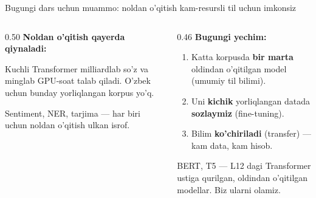 \documentclass[aspectratio=169,11pt]{beamer}
\begin{document}
\begin{frame}{Bugungi dars uchun muammo: noldan o'qitish kam-resursli til uchun imkonsiz}
  \begin{columns}[T]
    \begin{column}{0.50\textwidth}
      \textbf{Noldan o'qitish qayerda qiynaladi:}\\[3pt]
      \small
      \begin{tcolorbox}[warnbox,title={Ulkan ma'lumot talabi},top=2pt,bottom=2pt]
        \footnotesize
        Kuchli Transformer milliardlab so'z va minglab GPU-soat talab qiladi.
        O'zbek uchun bunday yorliqlangan korpus yo'q.
      \end{tcolorbox}
      \vspace{3pt}
      \begin{tcolorbox}[warnbox,title={Har vazifaga qaytadan},top=2pt,bottom=2pt]
        \footnotesize
        Sentiment, NER, tarjima --- har biri uchun noldan o'qitish ulkan isrof.
      \end{tcolorbox}
    \end{column}
    \begin{column}{0.46\textwidth}
      \textbf{Bugungi yechim:}\\[4pt]
      \small
      \begin{enumerate}\setlength\itemsep{4pt}
        \item Katta korpusda \textbf{bir marta} oldindan o'qitilgan model
              (umumiy til bilimi).
        \item Uni \textbf{kichik} yorliqlangan datada \textbf{sozlaymiz}
              (fine-tuning).
        \item Bilim \textbf{ko'chiriladi} (transfer) --- kam data, kam hisob.
      \end{enumerate}
      \vspace{5pt}
      \begin{tcolorbox}[okbox,top=2pt,bottom=2pt]
        \footnotesize
        BERT, T5 --- L12 dagi Transformer ustiga qurilgan, oldindan o'qitilgan
        modellar. Biz ularni olamiz.
      \end{tcolorbox}
    \end{column}
  \end{columns}
\end{frame}

\end{document}
